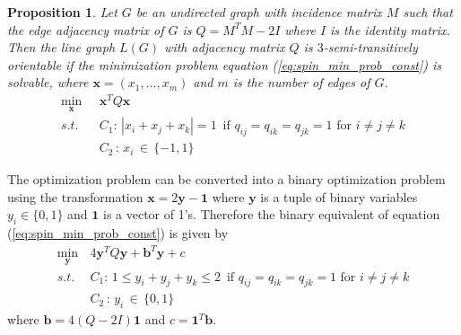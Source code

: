 \documentclass{article}
\newcommand{\mb}[1]{\boldsymbol{#1}}
\newtheorem{proposition}{Proposition}
\begin{document}

\begin{proposition}
\label{claim1}
Let $G$ be an undirected graph with incidence matrix $M$ such that the edge adjacency matrix of $G$ is $Q=M^{T}M -2I$ where $I$ is the identity matrix. Then the line graph $L(G)$ with adjacency matrix $Q$ is $3$-semi-transitively orientable if the minimization problem equation (\ref{eq:spin_min_prob_const}) is solvable, where $\mb{x}=(x_1,\dots,x_m)$ and $m$ is the number of edges of $G$.
\begin{align}
\label{eq:spin_min_prob_const}
    \min_{\mb{x}}\, \hspace{5pt} &\mb{x}^{T}Q\mb{x}\\
    s.t.\,
    &C_{1}:\,  |x_{i} + x_{j} + x_{k}| = 1 \,\text{ if } q_{ij}= q_{ik}=q_{jk} = 1 \text{ for } i\neq j\neq k\nonumber\\
    &C_{2} \,: \, x_{i}\,\in\,\{-1,1\}\nonumber
\end{align}
\end{proposition}

The optimization problem can be converted into a binary optimization problem using the transformation $\mb{x} = 2\mb{y} - \mb{1}$  where $\mb{y}$ is a tuple of binary variables $y_{i}\in \{0,1\}$ and $\mb{1}$ is a vector of 1's. Therefore the binary equivalent of equation (\ref{eq:spin_min_prob_const}) is given by
 \begin{align}
\label{eq:min_prob_const}
    \min_{\mb{y}}\, &4\mb{y}^{T}Q\mb{y} + \mb{b}^{T}\mb{y} + c \\
     s.t.\,
    &C_{1}:\,  1\leq y_{i} + y_{j} + y_{k} \leq 2 \,\text{ if } q_{ij}=q_{ik}=q_{jk} = 1 \text{ for } i\neq j\neq k\nonumber\\
    &C_{2} \,: \, y_{i}\,\in\,\{0,1\}\nonumber
\end{align}
where $ \mb{b} = 4(Q-2I)\mb{1}$ and $c = \mb{1}^{T}\mb{b}.$
\end{document}
